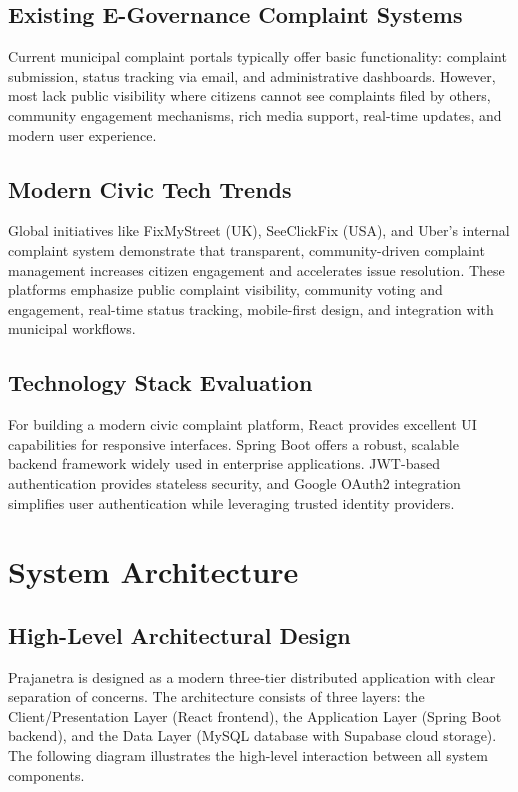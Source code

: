 \documentclass[12pt,a4paper]{report}
\begin{document}
\section{Existing E-Governance Complaint Systems}
Current municipal complaint portals typically offer basic functionality: complaint submission, status tracking via email, and administrative dashboards. However, most lack public visibility where citizens cannot see complaints filed by others, community engagement mechanisms, rich media support, real-time updates, and modern user experience.

\section{Modern Civic Tech Trends}
Global initiatives like FixMyStreet (UK), SeeClickFix (USA), and Uber's internal complaint system demonstrate that transparent, community-driven complaint management increases citizen engagement and accelerates issue resolution. These platforms emphasize public complaint visibility, community voting and engagement, real-time status tracking, mobile-first design, and integration with municipal workflows.

\section{Technology Stack Evaluation}
For building a modern civic complaint platform, React provides excellent UI capabilities for responsive interfaces. Spring Boot offers a robust, scalable backend framework widely used in enterprise applications. JWT-based authentication provides stateless security, and Google OAuth2 integration simplifies user authentication while leveraging trusted identity providers.


\chapter{System Architecture}

\section{High-Level Architectural Design}
Prajanetra is designed as a modern three-tier distributed application with clear separation of concerns. The architecture consists of three layers: the Client/Presentation Layer (React frontend), the Application Layer (Spring Boot backend), and the Data Layer (MySQL database with Supabase cloud storage). The following diagram illustrates the high-level interaction between all system components.
\end{document}
